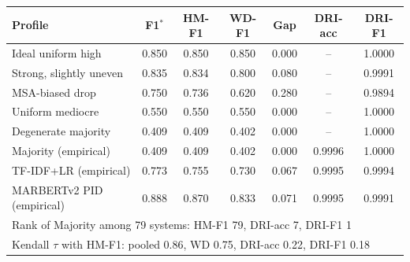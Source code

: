 \begin{tabular}{lcccccc}
\toprule
\textbf{Profile} & \textbf{F1}$^*$ & \textbf{HM-F1} & \textbf{WD-F1} & \textbf{Gap} & \textbf{DRI-acc} & \textbf{DRI-F1} \\
\midrule
Ideal uniform high & 0.850 & 0.850 & 0.850 & 0.000 & -- & 1.0000 \\
Strong, slightly uneven & 0.835 & 0.834 & 0.800 & 0.080 & -- & 0.9991 \\
MSA-biased drop & 0.750 & 0.736 & 0.620 & 0.280 & -- & 0.9894 \\
Uniform mediocre & 0.550 & 0.550 & 0.550 & 0.000 & -- & 1.0000 \\
Degenerate majority & 0.409 & 0.409 & 0.402 & 0.000 & -- & 1.0000 \\
\midrule
Majority (empirical) & 0.409 & 0.409 & 0.402 & 0.000 & 0.9996 & 1.0000 \\
TF-IDF+LR (empirical) & 0.773 & 0.755 & 0.730 & 0.067 & 0.9995 & 0.9994 \\
MARBERTv2 PID (empirical) & 0.888 & 0.870 & 0.833 & 0.071 & 0.9995 & 0.9991 \\
\midrule
\multicolumn{7}{l}{Rank of Majority among 79 systems: HM-F1 79, DRI-acc 7, DRI-F1 1} \\
\multicolumn{7}{l}{Kendall $\tau$ with HM-F1: pooled 0.86, WD 0.75, DRI-acc 0.22, DRI-F1 0.18} \\
\bottomrule
\end{tabular}
